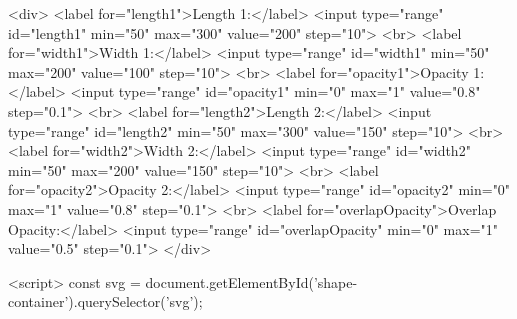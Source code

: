   <div>
    <label for="length1">Length 1:</label>
    <input type="range" id="length1" min="50" max="300" value="200" step="10">
    <br>
    <label for="width1">Width 1:</label>
    <input type="range" id="width1" min="50" max="200" value="100" step="10">
    <br>
    <label for="opacity1">Opacity 1:</label>
    <input type="range" id="opacity1" min="0" max="1" value="0.8" step="0.1">
    <br>
    <label for="length2">Length 2:</label>
    <input type="range" id="length2" min="50" max="300" value="150" step="10">
    <br>
    <label for="width2">Width 2:</label>
    <input type="range" id="width2" min="50" max="200" value="150" step="10">
    <br>
    <label for="opacity2">Opacity 2:</label>
    <input type="range" id="opacity2" min="0" max="1" value="0.8" step="0.1">
    <br>
    <label for="overlapOpacity">Overlap Opacity:</label>
    <input type="range" id="overlapOpacity" min="0" max="1" value="0.5" step="0.1">
  </div>

  <script>
    const svg = document.getElementById('shape-container').querySelector('svg');
    
